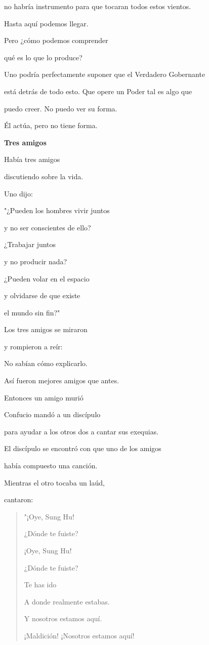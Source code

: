 no habría instrumento para que tocaran todos estos vientos.

Hasta aquí podemos llegar.

Pero ¿cómo podemos comprender

qué es lo que lo produce?

Uno podría perfectamente suponer que el Verdadero Gobernante

está detrás de todo esto. Que opere un Poder tal es algo que

puedo creer. No puedo ver su forma.

Él actúa, pero no tiene forma.

\textbf{{Tres amigos}}

Había tres amigos

discutiendo sobre la vida.

Uno dijo:

"¿Pueden los hombres vivir juntos

y no ser conscientes de ello?

¿Trabajar juntos

y no producir nada?

¿Pueden volar en el espacio

y olvidarse de que existe

el mundo sin fin?"

Los tres amigos se miraron

y rompieron a reír:

No sabían cómo explicarlo.

Así fueron mejores amigos que antes.

Entonces un amigo murió

Confucio mandó a un discípulo

para ayudar a los otros dos a cantar sus exequias.

El discípulo se encontró con que uno de los amigos

había compuesto una canción.

Mientras el otro tocaba un laúd,

cantaron:

\begin{quote}
"¡Oye, Sung Hu!

¿Dónde te fuiste?

¡Oye, Sung Hu!

¿Dónde te fuiste?

Te has ido

A donde realmente estabas.

Y nosotros estamos aquí.

¡Maldición! ¡Nosotros estamos aquí!
\end{quote}

